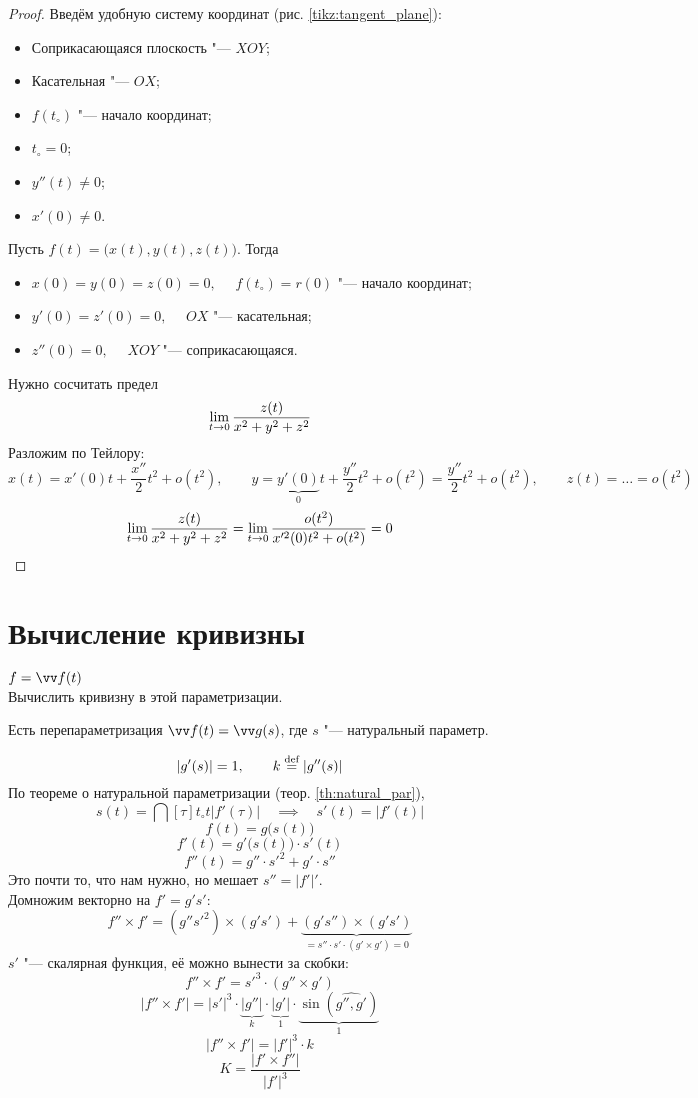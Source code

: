 \begin{proof}
    Введём удобную систему координат (рис. \ref{tikz:tangent_plane}):
    \begin{itemize}
    	\item Соприкасающаяся плоскость "--- $ XOY $;
        \item Касательная "--- $ OX $;
        \item $ f(t_\circ) $ "--- начало координат;
        \item $ t_\circ = 0 $;
        \item $ y''(t) \ne 0 $;
        \item $ x'(0) \ne 0 $.
    \end{itemize}

    Пусть $ f(t) = \bigg( x(t), y(t), z(t) \bigg) $. Тогда
    \begin{itemize}
    	\item $ x(0) = y(0) = z(0) = 0, \quad $ \as $ f(t_\circ) = r(0) $ "--- начало координат;
        \item $ y'(0) = z'(0) = 0, \quad $ \as $ OX $ "--- касательная;
        \item $ z''(0) = 0, \quad $ \as $ XOY $ "--- соприкасающаяся.
    \end{itemize}

    Нужно сосчитать предел
    $$ \lim\limits_{t\to0} \frac{z(t)}{x^2 + y^2 + z^2} $$
    Разложим по Тейлору:
    $$ x(t) = x'(0)t + \frac{x''}2t^2 + o(t^2), \qquad y = \underbrace{y'(0)}_0t + \frac{y''}2t^2 + o(t^2) = \frac{y''}2t^2 + o(t^2), \qquad z(t) = \dots = o(t^2) $$
    $$ \lim\limits_{t\to0} \frac{z(t)}{x^2 + y^2 + z^2} = \lim\limits_{t\to0} \frac{o(t^2)}{x'^2(0)t^2 + o(t^2)} = 0 $$
\end{proof}

\section{Вычисление кривизны}

\begin{problem}
	$ f = \vv f(t) $ \\
    Вычислить кривизну в этой параметризации.
\end{problem}

Есть перепараметризация $ \vv f(t) = \vv g(s) $, где $ s $ "--- натуральный параметр.

$$ | g'(s)| = 1, \qquad k \stackrel{\text{def}}{=} |g''(s)| $$
По теореме о натуральной параметризации (теор. \ref{th:natural_par}),
$$ s(t) = \dint[\tau]{t_\circ}t{|f'(\tau)|} \quad \implies \quad s'(t) = |f'(t)| $$
$$ f(t) = g \big( s(t) \big) $$
$$ f'(t) = g' \big( s(t) \big) \cdot s'(t) $$
$$ f''(t) = g'' \cdot s'^2 + g' \cdot s'' $$
Это почти то, что нам нужно, но мешает $ s'' = |f'|' $. \\
Домножим векторно на $ f' = g's' $:
$$ f'' \times f' = (g''s'^2) \times (g's') + \underbrace{(g's'') \times (g's')}_{= s'' \cdot s' \cdot (g' \times g') = 0} $$
$ s' $ "--- скалярная функция, её можно вынести за скобки:
$$ f'' \times f' = s'^3 \cdot (g'' \times g') $$
$$ |f'' \times f'| = |s'|^3 \cdot \underbrace{|g''|}_k \cdot \underbrace{|g'|}_1 \cdot \underbrace{\sin(\hat{g'', g'})}_1 $$
$$ |f'' \times f'| = |f'|^3 \cdot k $$
$$ \boxed{K = \frac{|f' \times f''|}{|f'|^3}} $$

